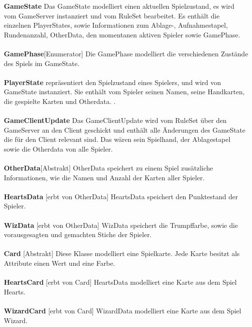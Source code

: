 \documentclass{article}
\begin{document}
		\textbf{GameState} Das GameState modelliert einen aktuellen Spielzustand, es wird vom GameServer instanziert und vom RuleSet bearbeitet. Es enthält die einzelnen PlayerStates, sowie Informationen zum Ablage-, Aufnahmestapel, Rundenanzahl, OtherData, den momentanen aktiven Spieler sowie GamePhase. \\ \\
		
		\textbf{GamePhase}[Enumerator] Die GamePhase modelliert die verschiedenen Zustände des Spiels im GameState. \\ \\
		
		\textbf{PlayerState} repräsentiert den Spielzustand eines Spielers, und wird von GameState instanziert. Sie enthält vom Spieler seinen Namen, seine Handkarten, die gespielte Karten und Otherdata. . \\ \\
		
		\textbf{GameClientUpdate} Das GameClientUpdate wird vom RuleSet über den GameServer an den Client geschickt und enthält alle Änderungen des GameState die für den Client relevant sind. Das wären sein Spielhand, der Ablagestapel sowie die Otherdata  von alle Spieler. \\ \\
		
		\textbf{OtherData}[Abstrakt] OtherData speichert zu einem Spiel zusätzliche Informationen, wie die Namen und Anzahl der Karten aller Spieler. \\ \\
		\textbf{HeartsData} [erbt von OtherData] HeartsData speichert den Punktestand der Spieler. \\ \\
		
		\textbf{WizData} [erbt von OtherData] WizData speichert die Trumpffarbe, sowie die vorausgesagten und gemachten Stiche der Spieler. \\ \\
		\textbf{Card} [Abstrakt] Diese Klasse modelliert eine Spielkarte. Jede Karte besitzt als Attribute einen Wert und eine Farbe. \\ \\
		
		\textbf{HeartsCard} [erbt von Card]  HeartsData modelliert eine Karte aus dem Spiel Hearts. \\ \\
		
		\textbf{WizardCard} [erbt von Card] WizardData modelliert eine Karte aus dem Spiel Wizard. \\ \\
\end{document}
